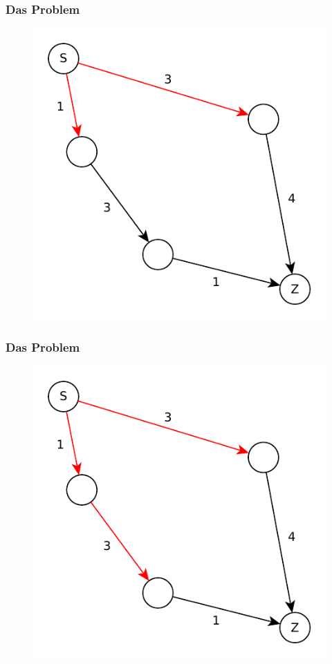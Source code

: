 \begin{frame}
\frametitle{Das Problem}
\begin{figure}
\includegraphics[scale=.8]{dijkstra_graphs/bfs_fail_2.pdf}
\end{figure}
\end{frame}

\begin{frame}
\frametitle{Das Problem}
\begin{figure}
\includegraphics[scale=.8]{dijkstra_graphs/bfs_fail_3.pdf}
\end{figure}
\end{frame}

